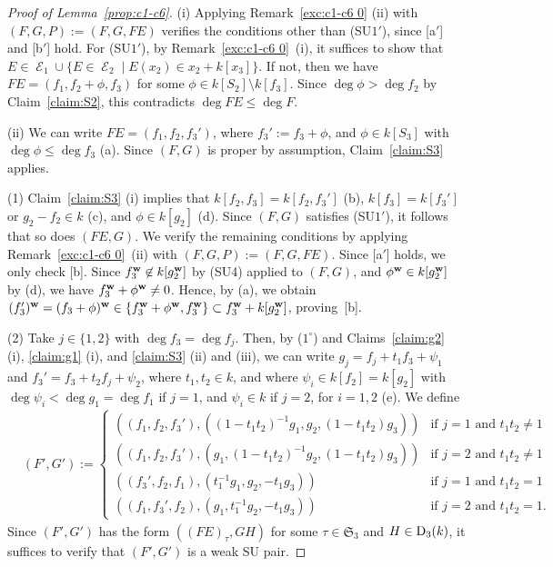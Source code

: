 \documentclass{amsart}
\theoremstyle{plain}
\theoremstyle{definition}
\newcommand{\E }{{\mathop{\mathcal{E}}\nolimits}}
\newcommand{\sm}{\setminus}
\newcommand{\w}{{\bf w}}
\newcommand{\sym}{\mathfrak{S}}
\begin{document}
\begin{proof}[Proof of Lemma~{\rm \ref{prop:c1-c6}}]
(i) 
Applying Remark~\ref{exc:c1-c6 0} (ii) with $(F,G,P):=(F,G,FE)$ 
verifies the conditions other than (SU$1'$), 
since [a$'$] and [b$'$] hold. 
For (SU$1'$), 
by Remark~\ref{exc:c1-c6 0}~(i), 
it suffices to show that 
$E\in \E _1\cup \{ E \in \E _2\mid E(x_2)\in x_2+k[x_3]\} $. 
If not, 
then we have $FE=(f_1,f_2+\phi ,f_3)$ 
for some $\phi \in k[S_2]\sm k[f_3]$. 
Since $\deg \phi >\deg f_2$ by Claim~\ref{claim:S2}, 
this contradicts $\deg FE\le \deg F$. 



(ii) 
We can write $FE=(f_1,f_2,f_3')$, 
where $f_3':=f_3+\phi $, 
and $\phi \in k[S_3]$ with $\deg \phi \le \deg f_3$ (a). 
Since $(F,G)$ is proper by assumption, 
Claim~\ref{claim:S3} applies. 



(1) 
Claim~\ref{claim:S3} (i) implies that 
$k[f_2,f_3]=k[f_2,f_3']$ (b), 
$k[f_3]=k[f_3']$ or $g_2-f_2\in k$ (c), and 
$\phi \in k[g_2]$ (d). 
Since $(F,G)$ satisfies (SU$1'$), 
it follows that so does $(FE,G)$. 
We verify the remaining conditions by applying 
Remark~\ref{exc:c1-c6 0}~(ii) with $(F,G,P):=(F,G,FE)$. 
Since [a$'$] holds, 
we only check [b]. 
Since $f_3^{\w }\not\in k[g_2^{\w }]$ 
by (SU4) applied to $(F,G)$, 
and $\phi ^{\w }\in k[g_2^{\w }]$ by (d), 
we have $f_3^{\w }+\phi ^{\w }\ne 0$. 
Hence, 
by (a), we obtain 
$(f_3')^{\w }=(f_3+\phi )^{\w }\in \{ f_3^{\w }+\phi ^{\w },f_3^{\w }\} 
\subset f_3^{\w }+k[g_2^{\w }]$, 
proving~[b]. 



(2) Take $j\in \{ 1,2\} $ with $\deg f_3=\deg f_j$. 
Then, 
by ($1^\circ $) and Claims~\ref{claim:g2} (i), 
\ref{claim:g1} (i), and \ref{claim:S3} (ii) and (iii), 
we can write $g_j=f_j+t_1f_3+\psi _1$ and $f_3'=f_3+t_2f_j+\psi _2$, 
where $t_1,t_2\in k$, 
and where 
$\psi _i\in k[f_2]=k[g_2]$ with $\deg \psi _i<\deg g_1=\deg f_1$ if $j=1$, 
and $\psi _i\in k$ if $j=2$, for $i=1,2$ (e). 
We define 
\begin{align*}
&(F',G'):=
\left\{ \!\!
\begin{array}{ll}
((f_1,f_2,f_3'),((1-t_1t_2)^{-1}g_1,g_2,(1-t_1t_2)g_3)) & 
\text{if $j=1$ and $t_1t_2\ne 1$} \\ 
((f_1,f_2,f_3'),(g_1,(1-t_1t_2)^{-1}g_2,(1-t_1t_2)g_3)) & 
\text{if $j=2$ and $t_1t_2\ne 1$} \\ 
((f_3',f_2,f_1),(t_1^{-1}g_1,g_2,-t_1g_3)) & 
\text{if $j=1$ and $t_1t_2=1$} \\ 
((f_1,f_3',f_2),(g_1,t_1^{-1}g_2,-t_1g_3)) & 
\text{if $j=2$ and $t_1t_2=1$.} 
\end{array}\!\! \right.
\end{align*}
Since $(F',G')$ has the form $((FE)_{\tau },GH)$ 
for some $\tau \in \sym _3$ and $H\in {\rm D}_3(k)$, 
it suffices to verify that $(F',G')$ is a weak SU pair. 




\end{proof}
\end{document}
